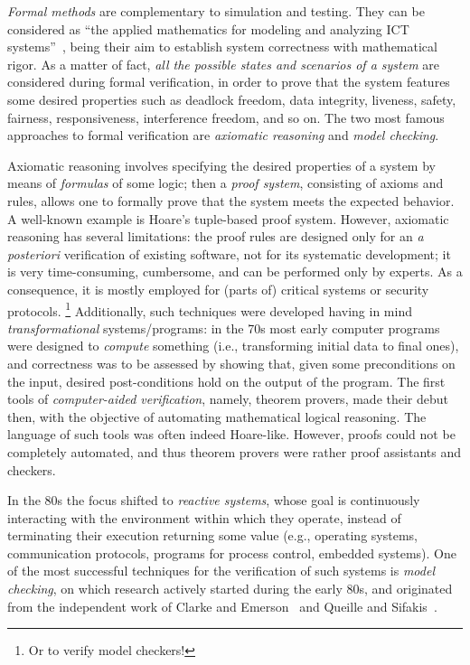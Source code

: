 \emph{Formal methods}
are complementary to simulation and testing.
They can be considered as ``the applied mathematics for modeling and analyzing ICT systems''~\cite{Baier2008}, being their aim to establish system correctness with mathematical rigor. As a matter of fact,
\emph{all the possible states and scenarios of a system} are considered during formal verification, in order to prove that the system features some desired properties such as deadlock freedom, data integrity, liveness, safety, fairness, responsiveness, interference freedom, and so on.
The two most famous approaches to formal verification are \emph{axiomatic reasoning}  and \emph{model checking}.

Axiomatic reasoning involves specifying the desired properties of a system by means of \emph{formulas} of some logic; then a \emph{proof system}, consisting of axioms and rules, allows one to formally prove that the system meets the expected behavior. A well-known example is Hoare's tuple-based proof system. 
%
However, axiomatic reasoning has several limitations:
the proof rules are designed only for an \emph{a posteriori} verification of existing software, not for its systematic development; 
it is very time-consuming, cumbersome, and can be performed only by experts. As a consequence, it is mostly employed for (parts of) critical systems or security protocols.%
\footnote{Or to verify model checkers!}
Additionally, such techniques were developed having in mind  \emph{transformational} systems/programs:
in the 70s most early computer programs were designed to \emph{compute} something (i.e., transforming initial data to final ones), and correctness was to be assessed by showing that, given some preconditions on the input, desired post-conditions hold on the output of the program. The first tools of \emph{computer-aided verification}, namely, theorem provers, made their debut then, with the objective of automating mathematical logical reasoning. The language of such tools was often indeed Hoare-like. However, proofs could not be completely automated, and thus theorem provers were rather proof assistants and checkers.

In the 80s the focus shifted to \emph{reactive systems}, whose goal is
continuously interacting with the environment within
which they operate, instead of terminating their execution returning some value
(e.g., operating systems, communication protocols, programs
for process control, embedded systems). 
One of the most successful techniques for the verification of such systems is \emph{model checking}, on which research actively started during the early 80s, and originated from the independent work of Clarke and Emerson~\cite{CE81} and Queille and Sifakis~\cite{Queille1982}.

